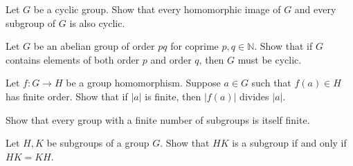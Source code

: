 \documentclass{problemset}
\begin{document}

\begin{exercise}
Let \(G\) be a cyclic group. Show that every homomorphic image of \(G\) and every subgroup of \(G\) is also cyclic.
\end{exercise}


\begin{exercise}
Let \(G\) be an abelian group of order \(pq\) for coprime \(p,q\in \mathbb{N}\).  Show that if \(G\) contains elements of both order \(p\) and order \(q\), then \(G\) must be cyclic.
\end{exercise}


\begin{exercise}
Let \(f:G \rightarrow H\) be a group homomorphism.  Suppose \(a\in G\) such that \(f(a) \in H\) has finite order.  Show that if \(|a|\) is finite,  then \(|f(a)|\) divides \( |a|\).
\end{exercise}


\begin{exercise}
Show that every group with a finite number of subgroups is itself finite.
\end{exercise}



\begin{exercise}
Let \(H,K\) be subgroups of a group \(G\). Show that \(HK\) is a subgroup if and only if \(HK=KH\).
\end{exercise}


\end{document}
